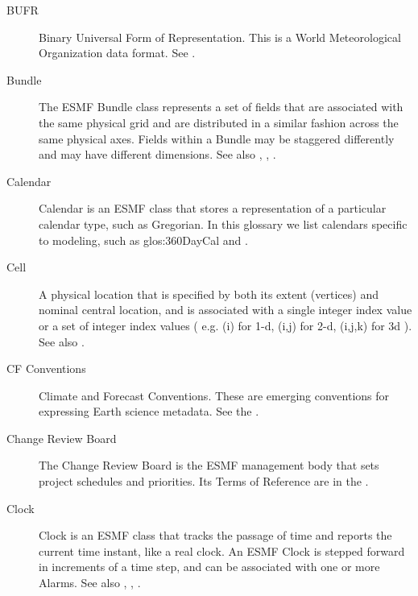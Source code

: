 \begin{description}
\label{glos:BUFR}
\item[BUFR]
  Binary Universal Form of Representation.  This is a World Meteorological Organization
data format.  See .

\label{glos:Bundle}
\item[Bundle] The ESMF Bundle class represents a set of fields that 
  are associated with the same physical grid and are distributed in a similar 
  fashion across the same physical axes.  Fields within a Bundle may be
  staggered differently and may have different dimensions. 
  See also , ,
  . 

\label{glos:Calendar}
\item[Calendar] Calendar is an ESMF class that 
  stores a representation of a particular calendar type, such as Gregorian.
  In this glossary we list calendars specific to modeling, 
  such as 
  {glos:360DayCal} and .

\label{glos:Cell}
\item[Cell] A physical location that is specified by both 
  its extent (vertices) and nominal central location, and is associated with 
  a single integer index value or a set of integer index values ( e.g.
  (i) for 1-d, (i,j) for 2-d, (i,j,k) for 3d ). 
  See also .

\label{glos:CF}
\item[CF Conventions]
Climate and Forecast Conventions.  These are emerging conventions for expressing 
Earth science metadata.  See the .

\label{glos:CRB}
\item[Change Review Board] The Change Review Board is the ESMF management
body that sets project schedules and priorities.  Its Terms of Reference
are in the .

\label{glos:Clock}
\item[Clock] Clock is an ESMF class that tracks the passage of time and 
  reports the current time instant, like a real clock.  An ESMF Clock 
  is stepped forward in increments of a time step, and can be associated
  with one or more Alarms.
  See also , , .


\end{description}
